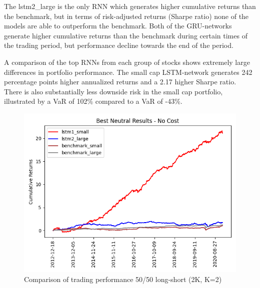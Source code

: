 \indent\newline 
The lstm2\_large is the only RNN which generates higher cumulative returns than the benchmark, but in terms of risk-adjusted returns (Sharpe ratio) none of the models are able to outperform the benchmark. Both of the GRU-networks generate higher cumulative returns than the benchmark during certain times of the trading period, but performance decline towards the end of the period.   

\indent\newline 
\begin{table}[ht]
\centering
{}
\caption{50/50 long-short comparison of top models (2K, K=2)}
\end{table}
\indent\newline 
A comparison of the top RNNs from each group of stocks shows extremely large differences in portfolio performance. The small cap LSTM-network generates 242 percentage points higher annualized returns and a 2.17 higher Sharpe ratio. There is also substantially less downside risk in the small cap portfolio, illustrated by a VaR of 102\% compared to a VaR of -43\%.

\indent\newline 
\begin{figure}[H]
\centering
\includegraphics [scale=0.60,angle=360]{figures/cumulative_best_neutral_mix_return_no_cost.png}
\caption{Comparison of trading performance 50/50 long-short (2K, K=2)}
\label{fig:mix50}
\end{figure}

